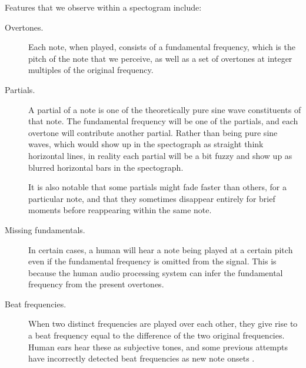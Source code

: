 \documentclass{article}
\begin{document}
Features that we observe within a spectogram include:
\begin{description}
\item[Overtones.]
  Each note, when played, consists of a fundamental frequency, which is the
  pitch of the note that we perceive, as well as a set of overtones at
  integer multiples of the original frequency.
\item[Partials.]
  A partial of a note is one of the theoretically pure sine wave constituents of
  that note. The fundamental frequency will be one of the partials, and each
  overtone will contribute another partial. Rather than being pure sine waves,
  which would show up in the spectograph as straight think horizontal lines, in
  reality each partial will be a bit fuzzy and show up as blurred horizontal
  bars in the spectograph.

  It is also notable that some partials might fade faster than others, for a
  particular note, and that they sometimes disappear entirely for brief moments
  before reappearing within the same note.
\item[Missing fundamentals.] 
  In certain cases, a human will hear a note being played at a certain pitch
  even if the fundamental frequency is omitted from the signal. This is because
  the human audio processing system can infer the fundamental frequency from
  the present overtones. 
\item[Beat frequencies.]
  When two distinct frequencies are played over each other, they give rise to
  a beat frequency equal to the difference of the two original frequencies.
  Human ears hear these as subjective tones, and some previous attempts have
  incorrectly detected beat frequencies as new note onsets
  \cite{marolt2004connectionist}. 
\end{description}
\end{document}
